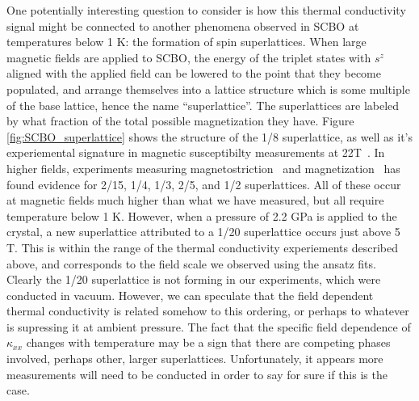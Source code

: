 \documentclass{thesis-umich}
\begin{document}
One potentially interesting question to consider is how this thermal conductivity signal might be connected to another phenomena observed in SCBO at temperatures below 1 K: the formation of spin superlattices. When large magnetic fields are applied to SCBO, the energy of the triplet states with $s^z$ aligned with the applied field can be lowered to the point that they become populated, and arrange themselves into a lattice structure which is some multiple of the base lattice, hence the name ``superlattice''. The superlattices are labeled by what fraction of the total possible magnetization they have. Figure \ref{fig:SCBO_superlattice} shows the structure of the 1/8 superlattice, as well as it's experiemental signature in magnetic susceptibilty measurements at 22T~\cite{Haravifard2016}. In higher fields, experiments measuring magnetostriction~\cite{Jaime2012} and magnetization~\cite{Matsuda2013} has found evidence for 2/15, 1/4, 1/3, 2/5, and 1/2 superlattices. All of these occur at magnetic fields much higher than what we have measured, but all require temperature below 1 K. However, when a pressure of 2.2 GPa is applied to the crystal, a new superlattice attributed to a 1/20 superlattice occurs just above 5 T. This is within the range of the thermal conductivity experiements described above, and corresponds to the field scale we observed using the ansatz fits. Clearly the 1/20 superlattice is not forming in our experiments, which were conducted in vacuum. However, we can speculate that the field dependent thermal conductivity is related somehow to this ordering, or perhaps to whatever is supressing it at ambient pressure. The fact that the specific field dependence of $\kappa_{xx}$ changes with temperature may be a sign that there are competing phases involved, perhaps other, larger superlattices. Unfortunately, it appears more measurements will need to be conducted in order to say for sure if this is the case. 
\end{document}
